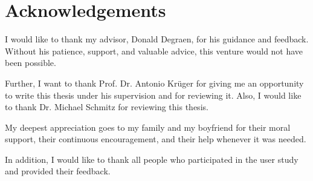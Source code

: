 ﻿\section*{Acknowledgements}
I would like to thank my advisor, Donald Degraen, for his guidance and feedback.
Without his patience, support, and valuable advice, this venture would not have been possible.

Further, I want to thank Prof. Dr. Antonio Krüger for giving me an opportunity to write this
thesis under his supervision and for reviewing it.
Also, I would like to thank Dr. Michael Schmitz for reviewing this thesis.

My deepest appreciation goes to my family and my boyfriend for their moral support, their continuous encouragement,
and their help whenever it was needed.

In addition, I would like to thank all people who participated in the user study and
provided their feedback.

